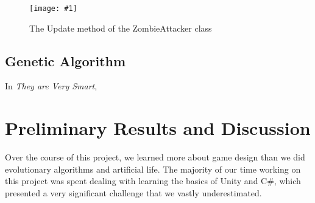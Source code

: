 \documentclass[letterpaper]{article}
\def\imfig#1#2{\begin{figure}[h] \centering \texttt{[image: \#1]} \caption{#2} \end{figure}}
\def\tavs{\textit{They are Very Smart}}
\begin{document}
\imfig{ZombieAttacker}{The Update method of the ZombieAttacker class}



\subsection{Genetic Algorithm}

In \tavs,




\section{Preliminary Results and Discussion}
Over the course of this project, we learned more about game design than we did
evolutionary algorithms and artificial life. The majority of our time working on
this project was spent dealing with learning the basics of Unity and C\#, which
presented a very significant challenge that we vastly underestimated.
\end{document}
